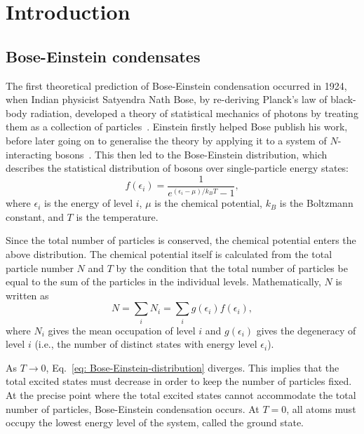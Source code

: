 \chapter{Introduction}\label{chap: intro}


\section{Bose-Einstein condensates}
The first theoretical prediction of Bose-Einstein condensation occurred in 1924,
when Indian physicist Satyendra Nath Bose, by re-deriving Planck's law of
black-body radiation, developed a theory of statistical mechanics of photons
by treating them as a collection of particles~\cite{Bose1924}.
Einstein firstly helped Bose publish his work, before later going on to
generalise the theory by applying it to a system of \(N\)-interacting
bosons~\cite{Einstein1925}.
This then led to the Bose-Einstein distribution, which describes the
statistical distribution of bosons over single-particle energy states:
\begin{equation}\label{eq: Bose-Einstein-distribution}
    f(\epsilon_i) = \frac{1}{e^{(\epsilon_i-\mu)/k_B T} - 1},
\end{equation}
where \(\epsilon_i\) is the energy of level \(i\), \(\mu \) is the chemical
potential, \(k_B\) is the Boltzmann constant, and \(T\) is the temperature.

Since the total number of particles is conserved, the chemical potential enters
the above distribution.
The chemical potential itself is calculated from the total particle number \(N\)
and \(T\) by the condition that the total number of particles be equal to the
sum of the particles in the individual levels.
Mathematically, \(N\) is written as
\begin{equation}
    N = \sum_i N_i = \sum_i g(\epsilon_i)f(\epsilon_i),
\end{equation}
where \(N_i\) gives the mean occupation of level \(i\) and \(g(\epsilon_i)\)
gives the degeneracy of level \(i\) (i.e., the number of distinct states with
energy level \(\epsilon_i\)).

As \(T \rightarrow 0\), Eq.~\eqref{eq: Bose-Einstein-distribution} diverges.
This implies that the total excited states must decrease in order to keep
the number of particles fixed.
At the precise point where the total excited states cannot accommodate the total
number of particles, Bose-Einstein condensation occurs.
At \(T=0\), all atoms must occupy the lowest energy level of the system, called
the ground state.

